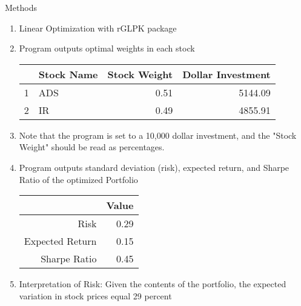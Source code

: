 \documentclass[handout,t]{beamer}
\begin{document}
\begin{frame}[allowframebreaks]{Methods}
\begin{doublespacing}
\begin{enumerate}
            	    \framebreak
            	    \item Linear Optimization with rGLPK package
            	    \item Program outputs optimal weights in each stock
                        \begin{table}[ht]
                        \centering
                        \begin{tabular}{rlrr}
                          \hline
                         & Stock Name & Stock Weight & Dollar Investment \\ 
                          \hline
                        1 & ADS & 0.51 & 5144.09 \\ 
                          2 & IR & 0.49 & 4855.91 \\ 
                           \hline
                        \end{tabular}
                        \end{table}
                    \item Note that the program is set to a 10,000 dollar investment, and the "Stock Weight" should be read as percentages.
            	    \framebreak
            	    \item Program outputs standard deviation (risk), expected return, and Sharpe Ratio of the optimized Portfolio
                        \begin{table}[ht]
                        \centering
                        \begin{tabular}{rr}
                          \hline
                         & Value \\ 
                          \hline
                        Risk & 0.29 \\ 
                          Expected Return & 0.15 \\ 
                          Sharpe Ratio & 0.45 \\ 
                           \hline
                        \end{tabular}
                        \end{table}
                    \item Interpretation of Risk: Given the contents of the portfolio, the expected variation in stock prices equal 29 percent
            	\end{enumerate}
            \end{doublespacing}
        \end{frame}
        
\end{document}
